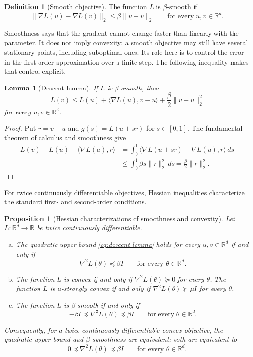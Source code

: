 \documentclass[11pt,twoside]{article}
\newcommand{\R}{\mathbb R}
\newtheorem{proposition}[theorem]{Proposition}
\newtheorem{lemma}[theorem]{Lemma}
\theoremstyle{definition}
\newtheorem{definition}[theorem]{Definition}
\theoremstyle{remark}
\begin{document}
\begin{definition}[Smooth objective]
\label{def:smoothness}
The function $L$ is $\beta$-smooth if
\[
 \|\nabla L(u)-\nabla L(v)\|_2
 \le \beta\|u-v\|_2
 \qquad\text{for every }u,v\in\R^d.
\]
\end{definition}

Smoothness says that the gradient cannot change faster than linearly with the
parameter. It does not imply convexity: a smooth objective may still have
several stationary points, including suboptimal ones. Its role here is to
control the error in the first-order approximation over a finite step. The
following inequality makes that control explicit.

\begin{lemma}[Descent lemma]
\label{lem:descent}
If $L$ is $\beta$-smooth, then
\begin{equation}
 L(v)\le L(u)+\langle\nabla L(u),v-u\rangle
              +\frac\beta2\|v-u\|_2^2
 \label{eq:descent-lemma}
\end{equation}
for every $u,v\in\R^d$.
\end{lemma}

\begin{proof}
Put $r=v-u$ and $g(s)=L(u+sr)$ for $s\in[0,1]$. The fundamental theorem of
calculus and smoothness give
\begin{align*}
 L(v)-L(u)-\langle\nabla L(u),r\rangle
 &=\int_0^1
   \langle\nabla L(u+sr)-\nabla L(u),r\rangle\,ds\\
 &\le\int_0^1\beta s\|r\|_2^2\,ds
 =\frac\beta2\|r\|_2^2.
\end{align*}
\end{proof}

For twice continuously differentiable objectives, Hessian inequalities
characterize the standard first- and second-order conditions.

\begin{proposition}[Hessian characterizations of smoothness and convexity]
\label{prop:hessian-characterizations}
Let $L:\R^d\to\R$ be twice continuously differentiable.
\begin{enumerate}[(a),leftmargin=*]
\item The quadratic upper bound \cref{eq:descent-lemma} holds for every
$u,v\in\R^d$ if and only if
\[
 \nabla^2L(\theta)\preceq\beta I
 \qquad\text{for every }\theta\in\R^d.
\]
\item The function $L$ is convex if and only if
$\nabla^2L(\theta)\succeq0$ for every $\theta$. The function $L$ is
$\mu$-strongly convex if and only if
$\nabla^2L(\theta)\succeq\mu I$ for every $\theta$.
\item The function $L$ is $\beta$-smooth if and only if
\[
 -\beta I\preceq\nabla^2L(\theta)\preceq\beta I
 \qquad\text{for every }\theta\in\R^d.
\]
\end{enumerate}
Consequently, for a twice continuously differentiable convex objective, the
quadratic upper bound and $\beta$-smoothness are equivalent; both are
equivalent to
\[
 0\preceq\nabla^2L(\theta)\preceq\beta I
 \qquad\text{for every }\theta\in\R^d.
\]
\end{proposition}
\end{document}
